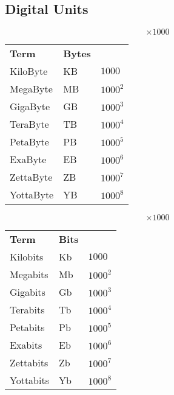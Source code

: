 \documentclass{report}
\begin{document}
\subsection*{Digital Units}
\begin{minipage}[t]{0.3\textwidth}
	\[\times 1000\]
	\begin{center}
		\begin{tabular}{l l l}
			\textbf{Term} & \textbf{Bytes}            \\
			KiloByte      & KB             & $1000$   \\
			MegaByte      & MB             & $1000^2$ \\
			GigaByte      & GB             & $1000^3$ \\
			TeraByte      & TB             & $1000^4$ \\
			PetaByte      & PB             & $1000^5$ \\
			ExaByte       & EB             & $1000^6$ \\
			ZettaByte     & ZB             & $1000^7$ \\
			YottaByte     & YB             & $1000^8$ \\
		\end{tabular}
	\end{center}
\end{minipage}
\hfill
\begin{minipage}[t]{0.3\textwidth}
	\[\times 1000\]
	\begin{center}
		\begin{tabular}{l l l}
			\textbf{Term} & \textbf{Bits}            \\
			Kilobits      & Kb            & $1000$   \\
			Megabits      & Mb            & $1000^2$ \\
			Gigabits      & Gb            & $1000^3$ \\
			Terabits      & Tb            & $1000^4$ \\
			Petabits      & Pb            & $1000^5$ \\
			Exabits       & Eb            & $1000^6$ \\
			Zettabits     & Zb            & $1000^7$ \\
			Yottabits     & Yb            & $1000^8$ \\
		\end{tabular}
	\end{center}
\end{minipage}
\hfill
\end{document}
